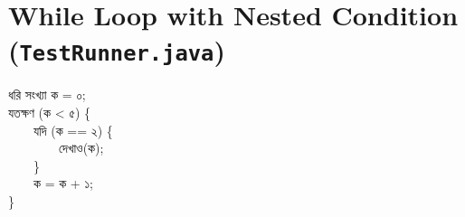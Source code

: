 \documentclass[12pt, a4paper]{report}
\begin{document}
\section[While Loop with Nested Condition (TestRunner.java)]{While Loop with Nested Condition\\ (\texttt{TestRunner.java})}
\begin{tcolorbox}[colback=codegray,colframe=black!20,arc=0mm,boxrule=0.5pt,left=10pt,right=10pt,top=4pt,bottom=4pt]
\ttfamily\small
ধরি সংখ্যা ক = ০;\\[6pt]
যতক্ষণ (ক < ৫) \{\\
\mbox{}~~~~যদি (ক == ২) \{\\
\mbox{}~~~~~~~~দেখাও(ক);\\
\mbox{}~~~~\}\\
\mbox{}~~~~ক = ক + ১;\\
\}
\end{tcolorbox}
\end{document}
